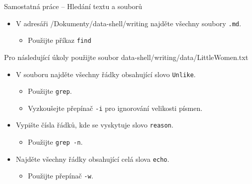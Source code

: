\documentclass{beamer}
\newcommand{\ts}{\raisebox{-0.25em}{\textasciitilde}}
\begin{document}
\begin{frame}{Samostatná práce – Hledání textu a souborů}
	\begin{itemize}
		\item V adresáři \texttt{\ts}/Dokumenty/data-shell/writing najděte všechny soubory \texttt{.md}.
		\begin{itemize}
			\item Použijte příkaz \texttt{find}
		\end{itemize}
	\end{itemize}
		\vspace{0.5em}
	Pro následující úkoly použijte soubor data-shell/writing/data/LittleWomen.txt
			\vspace{0.2em}
		\begin{itemize}
		\item V souboru najděte všechny řádky obsahující slovo \texttt{Unlike}.
		\begin{itemize}
			\item Použijte \texttt{grep}.
			\item Vyzkoušejte přepínač \texttt{-i} pro ignorování velikosti písmen.
		\end{itemize}
		\vspace{0.5em}
		\item Vypište čísla řádků, kde se vyskytuje slovo \texttt{reason}.
		\begin{itemize}
			\item Použijte \texttt{grep -n}.
		\end{itemize}
		\vspace{0.5em}
		\item Najděte všechny řádky obsahující celá slova \texttt{echo}.
		\begin{itemize}
			\item Použijte přepínač \texttt{-w}.
		\end{itemize}
	\end{itemize}
\end{frame}
\end{document}
